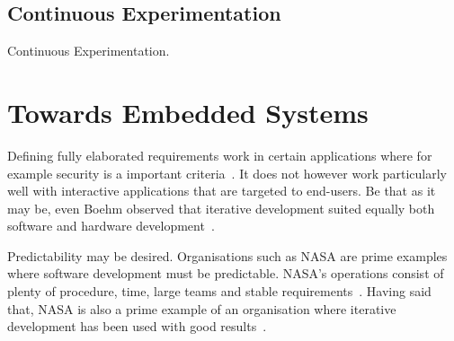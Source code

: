 \documentclass[english]{tktltiki2}
\begin{document}
\subsection{Continuous Experimentation}

Continuous Experimentation.


\section{Towards Embedded Systems}

Defining fully elaborated requirements work in certain applications where for example security is a important criteria~\cite{Boe88}. It does not however work particularly well with interactive applications that are targeted to end-users. Be that as it may be, even Boehm observed that iterative development suited equally both software and hardware development~\cite{Boe88}.

Predictability may be desired. Organisations such as NASA are prime examples where software development must be predictable. NASA’s operations consist of plenty of procedure, time, large teams and stable requirements~\cite{Fow05}. Having said that, NASA is also a prime example of an organisation where iterative development has been used with good results~\cite{LB03}.
\end{document}
